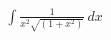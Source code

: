 \documentclass[preview]{standalone}
\begin{document}
\begin{align*}
\int \frac{1}{x^2\sqrt{(1+x^2)}} \, dx
\end{align*}
\end{document}
